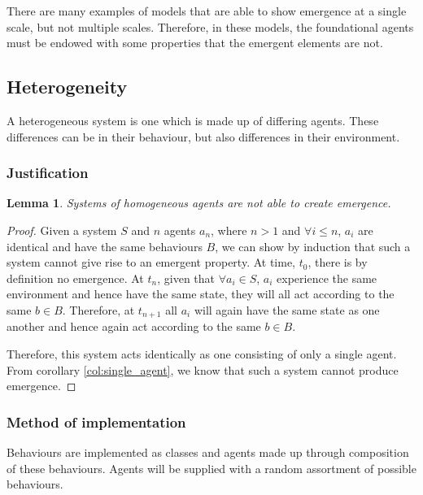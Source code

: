 \documentclass{article}
\newtheorem{lemma}[theorem]{Lemma}
\begin{document}
      There are many examples of models that are able to show emergence at a single scale, but not multiple scales. Therefore, in these models, the foundational agents must be endowed with some properties that the emergent elements are not. 

  \subsection{Heterogeneity}
  \label{sec: hetro}
  
    A heterogeneous system is one which is made up of differing agents. These differences can be in their behaviour, but also differences in their environment. 

    \subsubsection{Justification}

      \begin{lemma}
        Systems of homogeneous agents are not able to create emergence. 
      \end{lemma}
      \begin{proof}

        Given a system $S$ and $n$ agents $a_n$, where $n > 1$ and $\forall i \leq n$, $a_i$ are identical and have the same behaviours $B$, we can show by induction that such a system cannot give rise to an emergent property. At time, $t_0$, there is by definition no emergence. At $t_n$, given that $\forall a_i \in S$, $a_i$ experience the same environment and hence have the same state, they will all act according to the same $b \in B$. Therefore, at $t_{n+1}$ all $a_i$ will again have the same state as one another and hence again act according to the same $b \in B$.

        Therefore, this system acts identically as one consisting of only a single agent. From corollary \ref{col:single_agent}, we know that such a system cannot produce emergence.

      \end{proof}

    \subsubsection{Method of implementation}
      
      Behaviours are implemented as classes and agents made up through composition of these behaviours. Agents will be supplied with a random assortment of possible behaviours.
\end{document}
